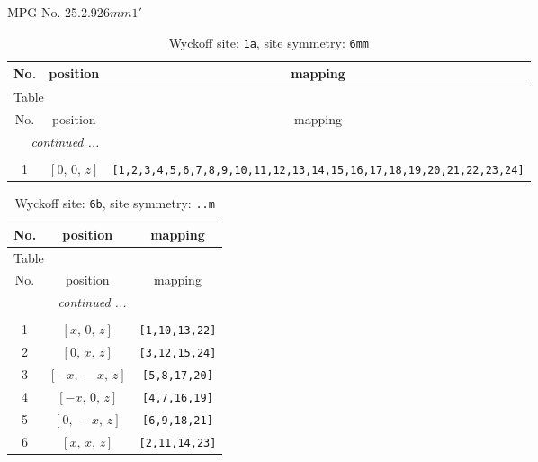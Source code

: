 \documentclass[fleqn,8pt]{jsarticle}
\begin{document}
\setcounter{MaxMatrixCols}{32}

\renewcommand{\tablename}{Table~}
\renewcommand{\figurename}{Figure~}
\begin{center}
\LARGE
MPG No. 25.2.92\quad$6mm1'$
\end{center}
\renewcommand{\arraystretch}{1.2}
\begin{longtable}{ccc}
\caption{Wyckoff site: {\tt 1a}, site symmetry: {\tt 6mm}}
 \\
 \hline \hline
No. & position & mapping \\ \hline \endfirsthead

\multicolumn{2}{l}{\tablename\ \thetable{}} \\
 \hline \hline
No. & position & mapping \\ \hline \endhead

 \hline \hline
\multicolumn{2}{r}{\footnotesize\it continued ...} \\ \endfoot

 \hline \hline
\multicolumn{2}{r}{} \\ \endlastfoot

1 & $\left[ 0,\, 0,\, z \right]$ & {\tt [1,2,3,4,5,6,7,8,9,10,11,12,13,14,15,16,17,18,19,20,21,22,23,24]} \\
\end{longtable}
\renewcommand{\arraystretch}{1.2}
\begin{longtable}{ccc}
\caption{Wyckoff site: {\tt 6b}, site symmetry: {\tt ..m}}
 \\
 \hline \hline
No. & position & mapping \\ \hline \endfirsthead

\multicolumn{2}{l}{\tablename\ \thetable{}} \\
 \hline \hline
No. & position & mapping \\ \hline \endhead

 \hline \hline
\multicolumn{2}{r}{\footnotesize\it continued ...} \\ \endfoot

 \hline \hline
\multicolumn{2}{r}{} \\ \endlastfoot

1 & $\left[ x,\, 0,\, z \right]$ & {\tt [1,10,13,22]} \\ \hline
2 & $\left[ 0,\, x,\, z \right]$ & {\tt [3,12,15,24]} \\ \hline
3 & $\left[ - x,\, - x,\, z \right]$ & {\tt [5,8,17,20]} \\ \hline
4 & $\left[ - x,\, 0,\, z \right]$ & {\tt [4,7,16,19]} \\ \hline
5 & $\left[ 0,\, - x,\, z \right]$ & {\tt [6,9,18,21]} \\ \hline
6 & $\left[ x,\, x,\, z \right]$ & {\tt [2,11,14,23]} \\
\end{longtable}
\end{document}
